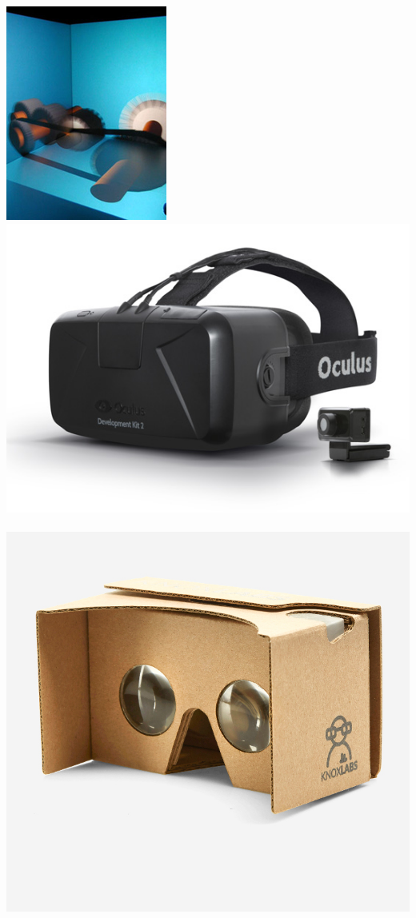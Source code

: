 \documentclass[utf8,stillsansserifmath,fleqn,t]{beamer}
\begin{document}
\begin{frame}
\begin{itemize}
\includegraphics[height=.18\textheight]{./fig/minicave.jpg}~
\includegraphics[height=.18\textheight]{./fig/oculus-rift-dk2.jpg}~
\includegraphics[height=.18\textheight]{./fig/cardboard.jpg}\\

\end{itemize}
\end{frame}
\end{document}
